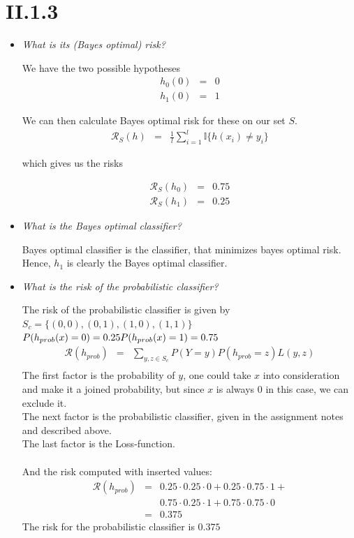 \documentclass[12pt, a4paper]{article}
\begin{document}
\section{II.1.3}
\begin{itemize}
\item \textit{What is its (Bayes optimal) risk?}

We have the two possible hypotheses
\begin{eqnarray}
	h_0(0) &=& 0 \\
	h_1(0) &=& 1
\end{eqnarray}

We can then calculate Bayes optimal risk for these on our set $S$.
\begin{eqnarray}
	\mathcal{R}_S(h) &=& \frac{1}{l}\sum^l_{i=1} \mathbb{I}\{h(x_i) \neq y_i\}
\end{eqnarray}

which gives us the risks

\begin{eqnarray}
	\mathcal{R}_S(h_0) &=& 0.75 \\
	\mathcal{R}_S(h_1) &=& 0.25
\end{eqnarray}

\item \textit{What is the Bayes optimal classifier?}

Bayes optimal classifier is the classifier, that minimizes bayes optimal risk. Hence, \underline{$h_1$} is clearly the Bayes optimal classifier.

\item \textit{What is the risk of the probabilistic classifier?}

The risk of the probabilistic classifier is given by\\
$S_c = \{(0,0),(0,1),(1,0),(1,1)\}$\\
$P(h_{prob}(x)=0) = 0.25\\
P(h_{prob}(x)=1) = 0.75 $
\begin{eqnarray*}
\mathcal{R}(h_{prob}) &=& \sum_{y,z\in S_c} P(Y=y)P(h_{prob}=z)L(y,z)\\ 
\end{eqnarray*}
The first factor is the probability of $y$, one could take $x$ into consideration and make it a joined probability, but since $x$ is always $0$ in this case, we can exclude it.\\
The next factor is the probabilistic classifier, given in the assignment notes and described above.\\
The last factor is the Loss-function.\\\\
And the risk computed with inserted values:
\begin{eqnarray*}
\mathcal{R}(h_{prob}) &=& 0.25 \cdot 0.25 \cdot 0 + 0.25 \cdot 0.75 \cdot 1 +\\
&& 0.75 \cdot 0.25 \cdot 1 + 0.75 \cdot 0.75 \cdot 0 \\
&=& 0.375
\end{eqnarray*}
The risk for the probabilistic classifier is $0.375$
\end{itemize}
\end{document}

